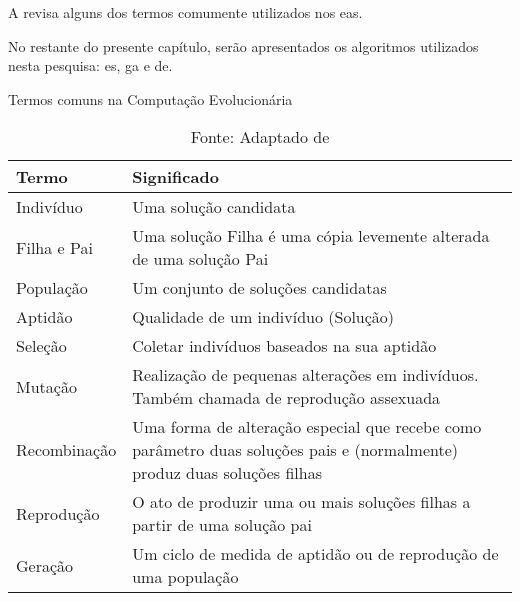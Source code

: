 A  revisa alguns dos termos comumente utilizados nos 
\acp{ea}.

No restante do presente capítulo, serão apresentados os algoritmos utilizados 
nesta pesquisa: \ac{es}, \ac{ga} e \ac{de}.

\begin{table}[tp]
	\centering
	\caption{Termos comuns na Computação Evolucionária}
	\label{tbl:evo_dict}
	\begin{tabularx}{\linewidth}{|X|X|}
		\hline
		\textbf{Termo} & \textbf{Significado} \\
		\hline
		Indivíduo & Uma solução candidata \\
		\hline
		Filha e Pai & Uma solução Filha é uma cópia levemente alterada de uma solução Pai \\
		\hline
		População & Um conjunto de soluções candidatas \\
		\hline
		Aptidão & Qualidade de um indivíduo (Solução) \\
		\hline
		Seleção & Coletar indivíduos baseados na sua aptidão \\
		\hline
		Mutação & Realização de pequenas alterações em indivíduos. Também chamada de reprodução assexuada \\
		\hline
		Recombinação & Uma forma de alteração especial que recebe como parâmetro duas soluções pais e (normalmente) produz duas soluções filhas \\
		\hline
		Reprodução & O ato de produzir uma ou mais soluções filhas a partir de uma solução pai \\
		\hline
		Geração & Um ciclo de medida de aptidão ou de reprodução de uma população \\
		\hline
	\end{tabularx}
	\caption*{Fonte: Adaptado de \citep{Luke2013Metaheuristics}}
\end{table}